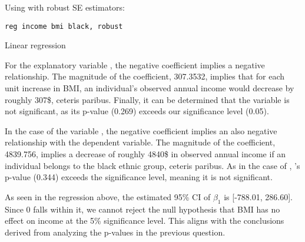 

\vspace{-1em}

Using  with robust SE estimators:

\begin{verbatim}
reg income bmi black, robust
\end{verbatim}

\begin{table}[H]
    \begin{center}
        \caption{Linear regression}
        
        \label{tab:reg2}    
    \end{center}
\end{table}


For the explanatory variable , the negative coefficient implies a negative relationship. The magnitude of the coefficient, 307.3532, implies that for each unit increase in BMI, an individual's observed annual income would decrease by roughly 307\$, ceteris paribus. Finally, it can be determined that the  variable is not significant, as its p-value (0.269) exceeds our significance level (0.05).

In the case of the variable , the negative coefficient implies an also negative relationship with the dependent variable. The magnitude of the coefficient, 4839.756, implies a decrease of roughly 4840\$ \space in observed annual income if an individual belongs to the black ethnic group, ceteris paribus. As in the case of , 's p-value (0.344) exceeds the significance level, meaning it is not significant.


As seen in the regression above, the estimated 95\% CI of $\beta_1$ is [-788.01, 286.60]. Since 0 falls within it, we cannot reject the null hypothesis that BMI has no effect on income at the 5\% significance level. This aligns with the conclusions derived from analyzing the p-values in the previous question.

